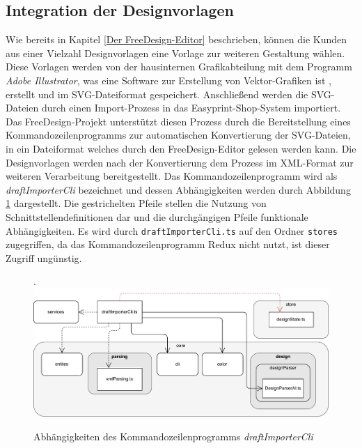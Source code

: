 \subsection{Integration der Designvorlagen}
\label{Kommandozeilenprogramme}
Wie bereits in Kapitel \ref{Der FreeDesign-Editor} beschrieben, können die Kunden aus einer Vielzahl Designvorlagen eine Vorlage zur weiteren Gestaltung wählen. 
Diese Vorlagen werden von der hausinternen Grafikabteilung mit dem Programm \emph{Adobe Illustrator}, was eine Software zur Erstellung von Vektor-Grafiken ist \autocite[vgl.][]{Adobe:Illustrator}, erstellt und im SVG-Dateiformat gespeichert. Anschließend werden die SVG-Dateien durch einen Import-Prozess in das Easyprint-Shop-System importiert. Das FreeDesign-Projekt unterstützt diesen Prozess durch die Bereitstellung eines Kommandozeilenprogramms zur automatischen Konvertierung der SVG-Dateien, in ein Dateiformat welches durch den FreeDesign-Editor gelesen werden kann. Die Designvorlagen werden nach der Konvertierung dem Prozess im XML-Format zur weiteren Verarbeitung bereitgestellt. 
Das Kommandozeilenprogramm wird als \emph{draftImporterCli} bezeichnet und dessen Abhängigkeiten werden durch Abbildung \ref{fig:DesignImport} dargestellt.
Die gestrichelten Pfeile stellen die Nutzung von Schnittstellendefinitionen dar und die durchgängigen Pfeile funktionale Abhängigkeiten. Es wird durch \lstinline|draftImporterCli.ts| auf den Ordner \lstinline|stores| zugegriffen, da das Kommandozeilenprogramm Redux nicht nutzt, ist dieser Zugriff ungünstig.


\begin{figure}[H]
    \centering
    \caption{Abhängigkeiten des Kommandozeilenprogramms \emph{draftImporterCli}}.
    \includegraphics[width=.9\textwidth]{diagrams/Ist-Architektur/draftImporter-analysis.pdf}
    \label{fig:DesignImport}
\end{figure}

